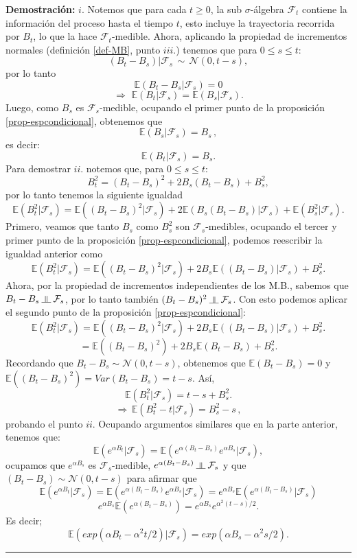 \textbf{Demostración:} $i.$ Notemos que para cada $t\geq 0$, la sub $\sigma$-álgebra $\mathcal{F}_t$ contiene la información del proceso hasta el tiempo $t$, esto incluye la trayectoria recorrida por $B_t$,  lo que la hace $\mathcal{F}_t$-medible. Ahora, aplicando la propiedad de incrementos normales (definición \ref{def-MB}, punto $iii.$) tenemos que para $0\leq s \leq t$:
\[(B_t - B_s) |\mathcal{F}_s\,\sim\,\mathcal{N}(0,t-s),\]
por lo tanto
\[\mathbb{E}\left(B_t - B_s|\mathcal{F}_s\right) = 0\]
\[\Rightarrow\,\,\mathbb{E}\left(B_t|\mathcal{F}_s\right) = \mathbb{E}\left(B_s|\mathcal{F}_s\right).\]
Luego, como $B_s$ es $\mathcal{F}_s$-medible, ocupando el primer punto de la proposición \ref{prop-espcondicional}, obtenemos que
\[\mathbb{E}\left(B_s|\mathcal{F}_s\right) = B_s\,,\]
es decir:
\[\mathbb{E}\left(B_t|\mathcal{F}_s\right) = B_s.\]
\newline
Para demostrar $ii.$ notemos que, para $0\leq s \leq t$:
\[B_t^2 = (B_t - B_s)^2 + 2B_s(B_t-B_s) + B_s^2,\]
por lo tanto tenemos la siguiente igualdad
\[\mathbb{E}\left(B_t^2|\mathcal{F}_s\right) = \mathbb{E}\left((B_t - B_s)^2|\mathcal{F}_s\right) + 2\mathbb{E}\left(B_s(B_t-B_s)|\mathcal{F}_s\right) + \mathbb{E}\left(B_s^2|\mathcal{F}_s\right).\]
Primero, veamos que tanto $B_s$ como $B_s^2$ son $\mathcal{F}_s$-medibles, ocupando el tercer y primer punto de la proposición \ref{prop-espcondicional}, podemos reescribir la igualdad anterior como
\[\mathbb{E}\left(B_t^2|\mathcal{F}_s\right) = \mathbb{E}\left((B_t - B_s)^2|\mathcal{F}_s\right) + 2B_s\mathbb{E}\left((B_t-B_s)|\mathcal{F}_s\right) + B_s^2.\]
Ahora, por la propiedad de incrementos independientes de los M.B., sabemos que $B_t-B_s \indep \mathcal{F}_s$, por lo tanto también $(B_t-B_s)^2 \indep \mathcal{F}_s$. Con esto podemos aplicar el segundo punto de la proposición \ref{prop-espcondicional}:
\[\mathbb{E}\left(B_t^2|\mathcal{F}_s\right) = \mathbb{E}\left((B_t - B_s)^2|\mathcal{F}_s\right) + 2B_s\mathbb{E}\left((B_t-B_s)|\mathcal{F}_s\right) + B_s^2.\]
\[ = \mathbb{E}\left((B_t - B_s)^2\right) + 2B_s\mathbb{E}\left(B_t-B_s\right) + B_s^2.\]
Recordando que $B_t-B_s \sim \mathcal{N}(0,t-s)$, obtenemos que $\mathbb{E}(B_t-B_s)=0$ y $\mathbb{E}((B_t-B_s)^2) = Var(B_t-B_s)=t-s$. Así,
\[\mathbb{E}\left(B_t^2|\mathcal{F}_s\right) = t-s + B_s^2.\]
\[\Rightarrow\,\mathbb{E}\left(B_t^2 - t|\mathcal{F}_s\right) = B_s^2 - s\,,\]
probando el punto $ii$.\newline
Ocupando argumentos similares que en la parte anterior, tenemos que:
\[\mathbb{E}\left(e^{\alpha B_t}|\mathcal{F}_s\right) = \mathbb{E}\left(e^{\alpha (B_t-B_s)}e^{\alpha B_s}|\mathcal{F}_s\right),\]
ocupamos que $e^{\alpha B_s}$ es $\mathcal{F}_s$-medible, $e^{\alpha (B_t-B_s)}\indep \mathcal{F}_s$ y que $(B_t-B_s) \sim \mathcal{N}(0,t-s)$ para afirmar que
\[\mathbb{E}\left(e^{\alpha B_t}|\mathcal{F}_s\right) = \mathbb{E}\left(e^{\alpha (B_t-B_s)}e^{\alpha B_s}|\mathcal{F}_s\right) = e^{\alpha B_s}\mathbb{E}\left(e^{\alpha (B_t-B_s)}|\mathcal{F}_s\right)\]
\[e^{\alpha B_s}\mathbb{E}\left(e^{\alpha (B_t-B_s)}\right) = e^{\alpha B_s} e^{\alpha^2(t-s)/2}.\]
Es decir;
\[\mathbb{E}\left(exp(\alpha B_t - \alpha^2 t/2)|\mathcal{F}_s\right) = exp(\alpha B_s - \alpha^2 s/2).\]
\rule{0.7em}{0.7em}\\

